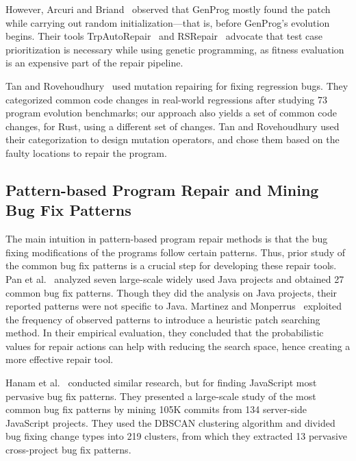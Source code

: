 However, Arcuri and Briand~\cite{arcuri2011practical} observed that GenProg mostly found the patch while carrying out random initialization---that is, before GenProg's evolution begins. Their tools TrpAutoRepair~\cite{qi2013efficient} and RSRepair~\cite{qi2014strength} advocate that test case prioritization is necessary while using genetic programming, as fitness evaluation is an expensive part of the repair pipeline.

Tan and Rovehoudhury~\cite{tan2015relifix} used mutation repairing for fixing regression bugs. They categorized common code changes in real-world regressions after studying 73 program evolution benchmarks; our approach also yields a set of common code changes, for Rust, using a different set of changes. Tan and Rovehoudhury used their categorization to design mutation operators, and chose them based on the faulty locations to repair the program.

\subsection{Pattern-based Program Repair and Mining Bug Fix Patterns}

The main intuition in pattern-based program repair methods is that the bug fixing modifications of the programs follow certain patterns. Thus, prior study of the common bug fix patterns is a crucial step for developing these repair tools. Pan et al.~\cite{pan2009toward} analyzed seven large-scale widely used Java projects and obtained 27 common bug fix patterns. Though they did the analysis on Java projects, their reported patterns were not specific to Java. Martinez and Monperrus~\cite{martinez2015mining,martinez2012mining} exploited the frequency of observed patterns to introduce a heuristic patch searching method. In their empirical evaluation, they concluded that the probabilistic values for repair actions can help with reducing the search space, hence creating a more effective repair tool.

Hanam et al.~\cite{hanam2016discovering} conducted similar research, but for finding JavaScript most pervasive bug fix patterns. They presented a large-scale study of the most common bug fix patterns by mining 105K commits from 134 server-side JavaScript projects. They used the DBSCAN clustering algorithm and divided bug fixing change types into 219 clusters, from which they extracted 13 pervasive cross-project bug fix patterns. 

